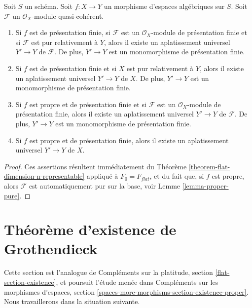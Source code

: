 \begin{lemma}
\label{lemma-when-universal-flattening}
Soit $S$ un schéma.
Soit $f : X \to Y$ un morphisme d'espaces algébriques sur $S$.
Soit $\mathcal{F}$ un $\mathcal{O}_X$-module quasi-cohérent.
\begin{enumerate}
\item Si $f$ est de présentation finie, si $\mathcal{F}$ est un
$\mathcal{O}_X$-module de présentation finie et si $\mathcal{F}$ est
pur relativement à $Y$, alors il existe un aplatissement universel
$Y' \to Y$ de $\mathcal{F}$. De plus, $Y' \to Y$ est un monomorphisme
de présentation finie.
\item Si $f$ est de présentation finie et si $X$ est pur relativement à $Y$,
alors il existe un aplatissement universel $Y' \to Y$ de $X$.
De plus, $Y' \to Y$ est un monomorphisme de présentation finie.
\item Si $f$ est propre et de présentation finie et si $\mathcal{F}$ est un
$\mathcal{O}_X$-module de présentation finie, alors il existe un
aplatissement universel $Y' \to Y$ de $\mathcal{F}$. De plus, $Y' \to Y$ est
un monomorphisme de présentation finie.
\item Si $f$ est propre et de présentation finie,
alors il existe un aplatissement universel $Y' \to Y$ de $X$.
\end{enumerate}
\end{lemma}

\begin{proof}
Ces assertions résultent immédiatement du
Théorème \ref{theorem-flat-dimension-n-representable}
appliqué à $F_0 = F_{flat}$,
et du fait que, si $f$ est propre, alors $\mathcal{F}$ est automatiquement
pur sur la base, voir
Lemme \ref{lemma-proper-pure}.
\end{proof}






\section{Théorème d'existence de Grothendieck}
\label{section-existence}

\noindent
Cette section est l'analogue de
Compléments sur la platitude, section \ref{flat-section-existence},
et poursuit l'étude menée dans
Compléments sur les morphismes d'espaces, section
\ref{spaces-more-morphisms-section-existence-proper}.
Nous travaillerons dans la situation suivante.

